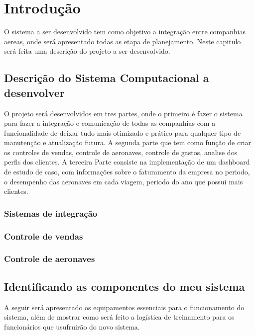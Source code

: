 

\chapter{ Introdu\c{c}\~{a}o}

O sistema a ser desenvolvido tem como objetivo a integração entre
companhias aereas, onde será
apresentado todas as etapa de planejamento. 
Neste capitulo será feita uma descrição do projeto
a ser desenvolvido.

\section{Descri\c{c}\~{a}o do Sistema Computacional a desenvolver}
O projeto será desenvolvidos em tres partes, onde o primeiro é fazer o sistema para fazer a integração 
e comunicação de todas as companhias com a funcionalidade de deixar tudo mais otimizado e prático para
qualquer tipo de manutenção e atualização futura.
A segunda parte que tem como função de criar os controles de vendas, controle de aeronaves, 
controle de gastos, analise dos perfis dos clientes.   
A terceira Parte consiste na implementação de um dashboard de estudo de caso, com informações 
sobre o faturamento da empresa no periodo, o desempenho das aeronaves em cada viagem, periodo do ano
que possui mais clientes.
\subsection{Sistemas de integração}

\subsection{Controle de vendas}

\subsection{Controle de aeronaves}


\section{Identificando as componentes do meu sistema}
A seguir será apresentado os equipamentos essenciais para o funcionamento do sistema, além de
mostrar como será feito a logística de treinamento para os funcionários que usufruirão do novo
sistema.

